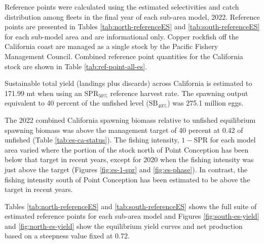 \documentclass[11pt,
  english,
  letterpaper,
]{article}
\begin{document}
Reference points were calculated using the estimated selectivities and catch distribution among fleets in the final year of each sub-area model, 2022. Reference points are presented in Tables \ref{tab:north-referenceES} and \ref{tab:south-referenceES} for each sub-model area and are informational only. Copper rockfish off the California coast are managed as a single stock by the Pacific Fishery Management Council. Combined reference point quantities for the California stock are shown in Table \ref{tab:ref-point-all-es}.

Sustainable total yield (landings plus discards) across California is estimated to 171.99 mt when using an \(\text{SPR}_{50\%}\) reference harvest rate. The spawning output equivalent to 40 percent of the unfished level (\(\text{SB}_{40\%}\)) was 275.1 million eggs.

The 2022 combined California spawning biomass relative to unfished equilibrium spawning biomass was above the management target of 40 percent at 0.42 of unfished (Table \ref{tab:es-ca-status}). The fishing intensity, \(1-\text{SPR}\) for each model area varied where the portion of the stock north of Point Conception has been below that target in recent years, except for 2020 when the fishing intensity was just above the target (Figures \ref{fig:es-1-spr} and \ref{fig:es-phase}). In contrast, the fishing intensity south of Point Conception has been estimated to be above the target in recent years.

Tables \ref{tab:north-referenceES} and \ref{tab:south-referenceES} shows the full suite of estimated reference points for each sub-area model and Figures \ref{fig:south-es-yield} and \ref{fig:north-es-yield} show the equilibrium yield curves and net production based on a steepness value fixed at 0.72.





\begingroup\fontsize{10}{12}\selectfont
\begingroup\fontsize{10}{12}\selectfont
\end{document}
